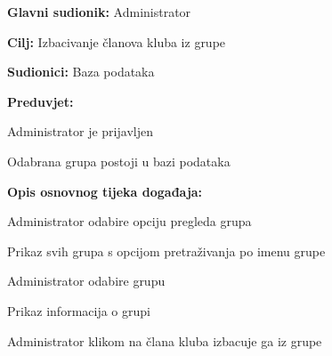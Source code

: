 \documentclass[times, utf8, zavrsni]{fer}
\newenvironment{packed_enum}{
	\begin{enumerate}
		\setlength{\itemsep}{0pt}
		\setlength{\parskip}{0pt}
		\setlength{\parsep}{0pt}
	}{\end{enumerate}}
\newenvironment{packed_item}{
	\begin{itemize}
		\setlength{\itemsep}{0pt}
		\setlength{\parskip}{0pt}
		\setlength{\parsep}{0pt}
	}{\end{itemize}}
\begin{document}
			\noindent {}
					\begin{packed_item}
						
						\item \textbf{Glavni sudionik: } Administrator
						\item  \textbf{Cilj:} Izbacivanje članova kluba iz grupe
						\item  \textbf{Sudionici:} Baza podataka
						\item  \textbf{Preduvjet:} 
						
						\item[] \begin{packed_enum}
							
							\item Administrator je prijavljen
							\item Odabrana grupa postoji u bazi podataka
							
							
						\end{packed_enum}
						
						\item  \textbf{Opis osnovnog tijeka događaja:}
						
						\item[] \begin{packed_enum}
							
							\item Administrator odabire opciju pregleda grupa
							\item Prikaz svih grupa s opcijom pretraživanja po imenu grupe
							\item Administrator odabire grupu
							\item Prikaz informacija o grupi
							\item Administrator klikom na člana kluba izbacuje ga iz grupe
							
							
						\end{packed_enum}
						
					\end{packed_item}
					
\end{document}
